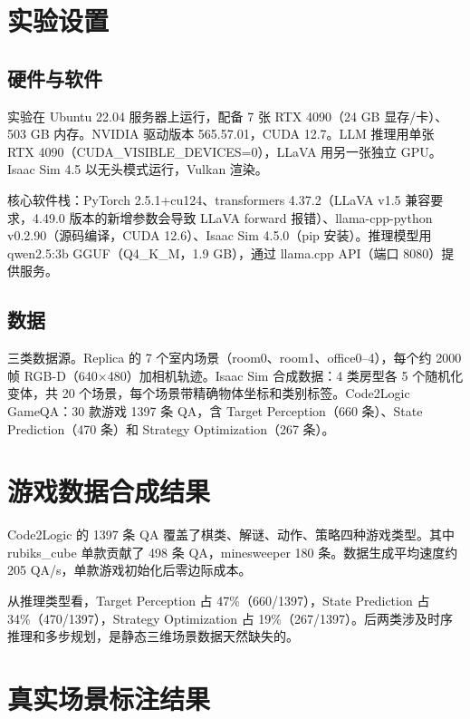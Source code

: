 
\section{实验设置}

\subsection{硬件与软件}

实验在 Ubuntu 22.04 服务器上运行，配备 7 张 RTX 4090（24 GB 显存/卡）、503 GB 内存。NVIDIA 驱动版本 565.57.01，CUDA 12.7。LLM 推理用单张 RTX 4090（CUDA\_VISIBLE\_DEVICES=0），LLaVA 用另一张独立 GPU。Isaac Sim 4.5 以无头模式运行，Vulkan 渲染。

核心软件栈：PyTorch 2.5.1+cu124、transformers 4.37.2（LLaVA v1.5 兼容要求，4.49.0 版本的新增参数会导致 LLaVA forward 报错）、llama-cpp-python v0.2.90（源码编译，CUDA 12.6）、Isaac Sim 4.5.0（pip 安装）。推理模型用 qwen2.5:3b GGUF（Q4\_K\_M，1.9 GB），通过 llama.cpp API（端口 8080）提供服务。

\subsection{数据}

三类数据源。Replica\cite{replica} 的 7 个室内场景（room0、room1、office0--4），每个约 2000 帧 RGB-D（640×480）加相机轨迹。Isaac Sim 合成数据：4 类房型各 5 个随机化变体，共 20 个场景，每个场景带精确物体坐标和类别标签。Code2Logic GameQA\cite{code2logic}：30 款游戏 1397 条 QA，含 Target Perception（660 条）、State Prediction（470 条）和 Strategy Optimization（267 条）。

\section{游戏数据合成结果}

Code2Logic 的 1397 条 QA 覆盖了棋类、解谜、动作、策略四种游戏类型。其中 rubiks\_cube 单款贡献了 498 条 QA，minesweeper 180 条。数据生成平均速度约 205 QA/s，单款游戏初始化后零边际成本。

从推理类型看，Target Perception 占 47\%（660/1397），State Prediction 占 34\%（470/1397），Strategy Optimization 占 19\%（267/1397）。后两类涉及时序推理和多步规划，是静态三维场景数据天然缺失的。

\section{真实场景标注结果}

